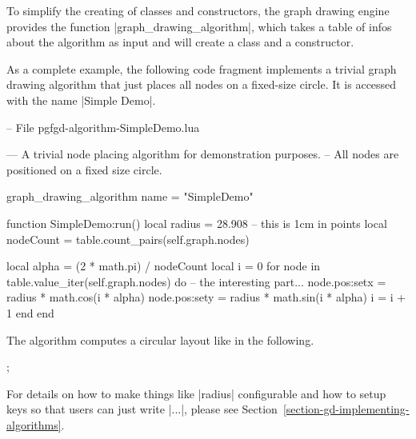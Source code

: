 To simplify the creating of classes and constructors, the graph
drawing engine provides the function |graph_drawing_algorithm|, which
takes a table of infos about the algorithm as input and will create a
class and a constructor.

As a complete example, the following code fragment implements a
trivial graph drawing algorithm that just places all nodes on a
fixed-size circle.  It is accessed with the name 
|Simple Demo|.


\begin{codeexample}
-- File pgfgd-algorithm-SimpleDemo.lua

--- A trivial node placing algorithm for demonstration purposes.
-- All nodes are positioned on a fixed size circle.

graph_drawing_algorithm { name = "SimpleDemo" }

function SimpleDemo:run()
   local radius = 28.908  -- this is 1cm in points
   local nodeCount = table.count_pairs(self.graph.nodes)

   local alpha = (2 * math.pi) / nodeCount
   local i = 0
   for node in table.value_iter(self.graph.nodes) do
      -- the interesting part...
      node.pos:set{x = radius * math.cos(i * alpha)}
      node.pos:set{y = radius * math.sin(i * alpha)}
      i = i + 1
   end
end
\end{codeexample}

The algorithm computes a circular layout like in the following.

\begin{codeexample}[]
\tikz [graph drawing scope, /graph drawing/algorithm=Simple Demo]
  ;
\end{codeexample}

For details on how to make things like |radius| configurable and how
to setup keys so that users can just write
| ...|, please see Section~\ref{section-gd-implementing-algorithms}.


\endinput

